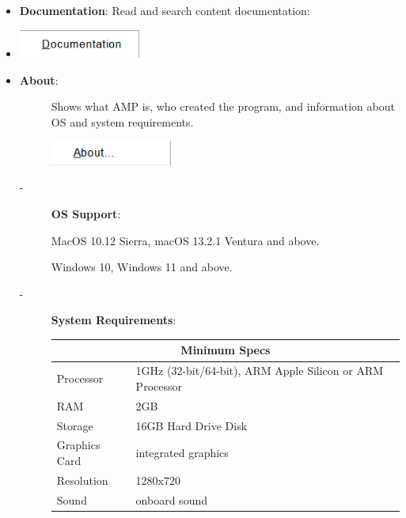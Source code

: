 \documentclass{article}
\begin{document}
\begin{itemize}
    \item \textbf{Documentation}: Read and search content documentation:
    \item[] \includegraphics[width=4cm]{Images/Help Documentation.png}
    \item \textbf{About}:
    \begin{description}
        \item[] Shows what AMP is, who created the program, and information about OS and system requirements.
        \item[] \includegraphics[width=4cm]{Images/Help About.png}
        
        \vspace{0.5cm}
        
        \item[-] \textbf{OS Support}:        
            \item[]  MacOS 10.12 Sierra, macOS 13.2.1 Ventura and above.
            \item[]  Windows 10, Windows 11 and above.
            \vspace{0.2cm}
        \item[-] \textbf{System Requirements}:

            {
            \begin{tabular}{ |p{3cm}|p{10cm}| }
            \hline
            \multicolumn{2}{|c|}{\textbf{Minimum Specs}} \\
            \hline
            Processor & 1GHz (32-bit/64-bit), ARM Apple Silicon or ARM Processor \\
            RAM & 2GB \\
            Storage & 16GB Hard Drive Disk \\
            Graphics Card & integrated graphics \\
            Resolution & 1280x720 \\
            Sound & onboard sound \\
            \hline
            \end{tabular}

}
\end{description}
\end{itemize}
\end{document}

